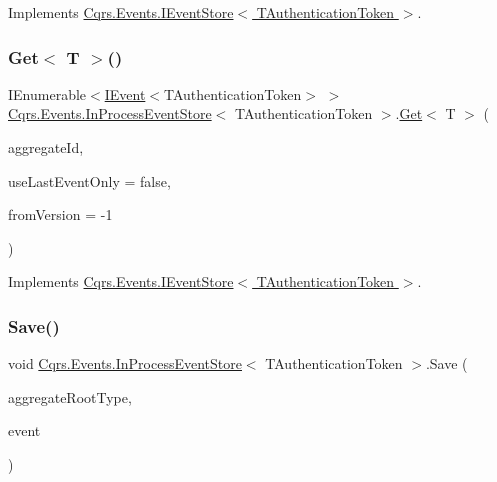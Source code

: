 Implements \hyperlink{interfaceCqrs_1_1Events_1_1IEventStore_af398bb6768fa661ad97a9fa9ecfbd9fb_af398bb6768fa661ad97a9fa9ecfbd9fb}{Cqrs.\+Events.\+I\+Event\+Store$<$ T\+Authentication\+Token $>$}.

\mbox{\label{classCqrs_1_1Events_1_1InProcessEventStore_a425206c170ac3d000652dfdab181b340_a425206c170ac3d000652dfdab181b340}} 
\subsubsection{\texorpdfstring{Get$<$ T $>$()}{Get< T >()}}
{\footnotesize\ttfamily I\+Enumerable$<$\hyperlink{interfaceCqrs_1_1Events_1_1IEvent}{I\+Event}$<$T\+Authentication\+Token$>$ $>$ \hyperlink{classCqrs_1_1Events_1_1InProcessEventStore}{Cqrs.\+Events.\+In\+Process\+Event\+Store}$<$ T\+Authentication\+Token $>$.\hyperlink{classCqrs_1_1Events_1_1InProcessEventStore_ac588cacc020921c5120b290b95c641e7_ac588cacc020921c5120b290b95c641e7}{Get}$<$ T $>$ (\begin{DoxyParamCaption}\item[{Guid}]{aggregate\+Id,  }\item[{bool}]{use\+Last\+Event\+Only = {\ttfamily false},  }\item[{int}]{from\+Version = {\ttfamily -\/1} }\end{DoxyParamCaption})}



Implements \hyperlink{interfaceCqrs_1_1Events_1_1IEventStore_add6227e2978ff8656aad79b1a51bf34c_add6227e2978ff8656aad79b1a51bf34c}{Cqrs.\+Events.\+I\+Event\+Store$<$ T\+Authentication\+Token $>$}.

\mbox{\label{classCqrs_1_1Events_1_1InProcessEventStore_a93e6d7dc5b81ffba6a89cf22b273d0c9_a93e6d7dc5b81ffba6a89cf22b273d0c9}} 
\subsubsection{\texorpdfstring{Save()}{Save()}}
{\footnotesize\ttfamily void \hyperlink{classCqrs_1_1Events_1_1InProcessEventStore}{Cqrs.\+Events.\+In\+Process\+Event\+Store}$<$ T\+Authentication\+Token $>$.Save (\begin{DoxyParamCaption}\item[{Type}]{aggregate\+Root\+Type,  }\item[{\hyperlink{interfaceCqrs_1_1Events_1_1IEvent}{I\+Event}$<$ T\+Authentication\+Token $>$ @}]{event }\end{DoxyParamCaption})}



